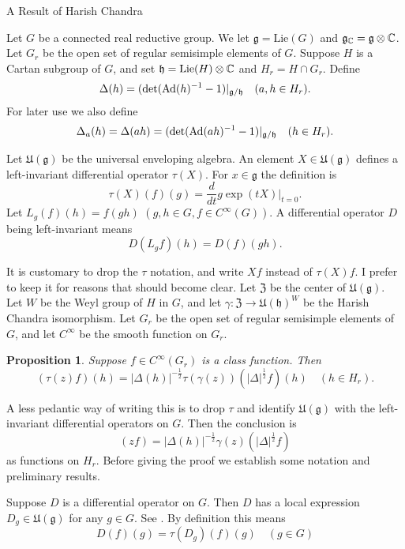 \documentclass{article}
\newtheorem{pro}[thm]{Proposition}
\theoremstyle{definition}
\numberwithin{equation}{section}
\renewcommand{\-}{\hyp{}}
\newcommand{\inv}{^{-1}}
\newcommand{\z}{\mathfrak Z}
\newcommand{\U}{\mathfrak U}
\newcommand{\g}{\mathfrak g}
\newcommand{\h}{\mathfrak h}
\begin{document}
\begin{mytitle} A Result of Harish Chandra\end{mytitle}


Let $G$ be
 a connected real reductive group.
We let $\g=\mathrm{Lie}(G)$ and $\g_\C=\g\otimes\C$.
Let $G_r$ be the open set of regular semisimple elements of $G$. Suppose $H$ is a  Cartan subgroup of $G$, and set $\h=\mathrm{Lie}(H)\otimes\C$ and 
$H_r=H\cap G_r$.
Define
$$
\Delta(h)=(\det(\Ad(h)\inv -1)|_{\g/\h}\quad (a,h\in H_r).
$$
For later use we also define
$$
\Delta_a(h)=\Delta(ah)=(\det(\Ad(ah)\inv -1)|_{\g/\h}\quad (h\in H_r).
$$

Let $\U(\g)$ be the universal enveloping algebra. 
An element $X\in \U(\g)$ defines a left-invariant differential operator $\tau(X)$.
For $x\in \g$ the definition is
$$\tau(X)(f)(g)=\frac d{dt}g\exp(tX)|_{t=0}.
$$
Let $L_g(f)(h)=f(gh)$ $(g,h\in G,f\in C^\infty(G))$. A differential operator $D$ being left-invariant means 
\begin{equation}
\label{e:left}
D(L_gf)(h)=D(f)(gh).
\end{equation}

It is customary to drop the $\tau$ notation, and write $Xf$ instead of $\tau(X)f$. I prefer to keep it for reasons that should become clear.
Let $\z$ be the center of  $\U(\g)$.
Let $W$ be the Weyl group of $H$ in $G$, and 
let $\gamma:\z\rightarrow \U(\h)^W$ be the Harish Chandra isomorphism.
Let $G_r$ be the open set of regular semisimple elements of $G$, and let $C^\infty$ be the smooth function on $G_r$. 


\begin{pro}
Suppose $f\in C^\infty(G_r)$ is a class function. Then
$$
(\tau(z)f)(h)=|\Delta(h)|^{-\frac12}\tau(\gamma(z))(|\Delta|^{\frac12}f)(h)\quad (h\in H_r).
$$
\end{pro}

A less pedantic way of writing this is to drop $\tau$ and identify $\U(\g)$ with the left-invariant differential operators on $G$. Then
the conclusion is
$$
(zf)=|\Delta(h)|^{-\frac12}\gamma(z)(|\Delta|^{\frac12}f)
$$
as functions on $H_r$.
Before giving the proof we establish some notation and preliminary results.



Suppose $D$ is a differential operator on $G$. Then $D$ has a local expression $D_g\in\U(\g)$ for any $g\in G$.
See \cite[Section 4]{HC_characters}.
By definition this means
\begin{equation}
  \label{e:tau}
  D(f)(g)=\tau(D_g)(f)(g)\quad(g\in G)
\end{equation}
\end{document}
